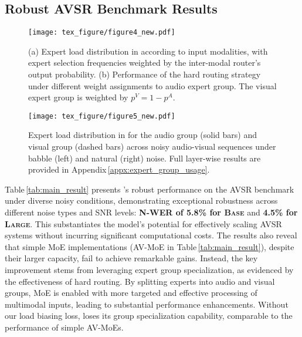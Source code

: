 \subsection{Robust AVSR Benchmark Results}
\label{sec:results}

\begin{figure*}[!t]
    \centering
    \texttt{[image: tex\_figure/figure4\_new.pdf]}
    \vspace{-22pt}
    \caption{(a) Expert load distribution in \ourmodel according to input modalities, with expert selection frequencies weighted by the inter-modal router’s output probability. (b) Performance of the hard routing strategy under different weight assignments to audio expert group. The visual expert group is weighted by $p^V = 1-p^A$.
    }
    \label{fig:expert_load}
\end{figure*}

\begin{figure*}[!t]
    \centering
    \vspace{-3pt}
    \texttt{[image: tex\_figure/figure5\_new.pdf]}
    \vspace{-22pt}
    \caption{Expert load distribution in \ourmodel for the audio group (solid bars) and visual group (dashed bars) across noisy audio-visual sequences under babble (left) and natural (right) noise. Full layer-wise results are provided in Appendix\,\ref{appx:expert_group_usage}.
    }
    \label{fig:expert_load_noise}
\end{figure*}


Table\,\ref{tab:main_result} presents \ourmodel's robust performance on the AVSR benchmark under diverse noisy conditions, demonstrating exceptional robustness across different noise types and SNR levels: \textbf{N-WER of 5.8\% for \textsc{Base}} and \textbf{4.5\% for \textsc{Large}}. This substantiates the model's potential for effectively scaling AVSR systems without incurring significant computational costs.
%
The results also reveal that simple MoE implementations (AV-MoE in Table\,\ref{tab:main_result}), despite their larger capacity, fail to achieve remarkable gains. Instead, the key improvement stems from leveraging expert group specialization, as evidenced by the effectiveness of hard routing. By splitting experts into audio and visual groups, MoE is enabled with more targeted and effective processing of multimodal inputs, leading to substantial performance enhancements.
Without our load biasing loss, \ourmodel loses its group specialization capability, comparable to the performance of simple AV-MoEs.

